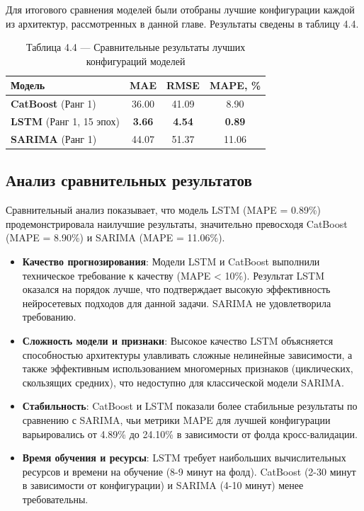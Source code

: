 \hspace*{1.25cm}Для итогового сравнения моделей были отобраны лучшие конфигурации каждой из архитектур, рассмотренных в данной главе. Результаты сведены в таблицу 4.4.

\begin{table}[H]
	\centering
	\caption*{Таблица 4.4 --- Сравнительные результаты лучших конфигураций моделей}
	\begin{tabular}{|l|c|c|c|}
		\hline
		\textbf{Модель} & \textbf{MAE} & \textbf{RMSE} & \textbf{MAPE, \%} \\
		\hline
		\textbf{CatBoost} (Ранг 1) & 36.00 & 41.09 & 8.90 \\
		\hline
		\textbf{LSTM} (Ранг 1, 15 эпох) & \textbf{3.66} & \textbf{4.54} & \textbf{0.89} \\
		\hline
		\textbf{SARIMA} (Ранг 1) & 44.07 & 51.37 & 11.06 \\
		\hline
	\end{tabular}
	\label{tab:comparison_results}
\end{table}

\subsection{Анализ сравнительных результатов}

\hspace*{1.25cm}Сравнительный анализ показывает, что модель LSTM (MAPE = 0.89\%) продемонстрировала наилучшие результаты, значительно превосходя CatBoost (MAPE = 8.90\%) и SARIMA (MAPE = 11.06\%).

\begin{itemize}
    \item \textbf{Качество прогнозирования}: Модели LSTM и CatBoost выполнили техническое требование к качеству (MAPE < 10\%). Результат LSTM оказался на порядок лучше, что подтверждает высокую эффективность нейросетевых подходов для данной задачи. SARIMA не удовлетворила требованию.
    
    \item \textbf{Сложность модели и признаки}: Высокое качество LSTM объясняется способностью архитектуры улавливать сложные нелинейные зависимости, а также эффективным использованием многомерных признаков (циклических, скользящих средних), что недоступно для классической модели SARIMA.
    
    \item \textbf{Стабильность}: CatBoost и LSTM показали более стабильные результаты по сравнению с SARIMA, чьи метрики MAPE для лучшей конфигурации варьировались от 4.89\% до 24.10\% в зависимости от фолда кросс-валидации.
    
    \item \textbf{Время обучения и ресурсы}: LSTM требует наибольших вычислительных ресурсов и времени на обучение (8-9 минут на фолд). CatBoost (2-30 минут в зависимости от конфигурации) и SARIMA (4-10 минут) менее требовательны.
\end{itemize}

